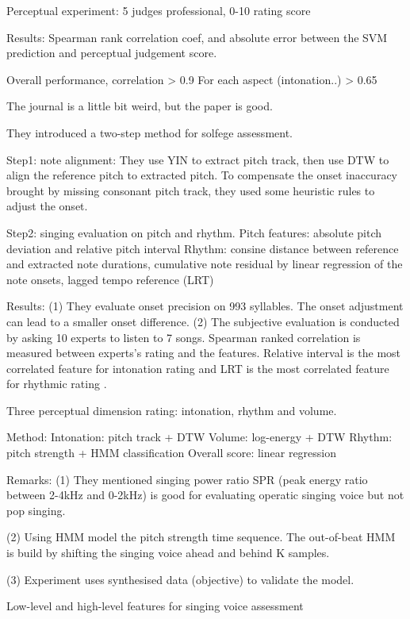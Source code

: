 Perceptual experiment:
5 judges professional, 0-10 rating score

Results:
Spearman rank correlation coef, and absolute error between the SVM prediction and perceptual judgement score.

Overall performance, correlation > 0.9
For each aspect (intonation..) > 0.65

 The journal is a little bit weird, but the paper is good.

They introduced a two-step method for solfege assessment.

Step1: note alignment: They use YIN to extract pitch track, then use DTW to align the reference pitch to extracted pitch. To compensate the onset inaccuracy brought by missing consonant pitch track, they used some heuristic rules to adjust the onset.

Step2: singing evaluation on pitch and rhythm. 
Pitch features: absolute pitch deviation and relative pitch interval
Rhythm: consine distance between reference and extracted note durations, cumulative note residual by linear regression of the note onsets, lagged tempo reference (LRT)

Results:
(1) They evaluate onset precision on 993 syllables. The onset adjustment can lead to a smaller onset difference.
(2) The subjective evaluation is conducted by asking 10 experts to listen to 7 songs. Spearman ranked correlation is measured between experts's rating and the features. Relative interval is the most correlated feature for intonation rating and LRT is the most correlated feature for rhythmic rating
.

 Three perceptual dimension rating: intonation, rhythm and volume.

Method:
Intonation: pitch track + DTW 
Volume: log-energy + DTW
Rhythm: pitch strength + HMM classification
Overall score: linear regression

Remarks:
(1) They mentioned singing power ratio SPR (peak energy ratio between 2-4kHz and 0-2kHz) is good for evaluating operatic singing voice but not pop singing.

(2) Using HMM model the pitch strength time sequence. The out-of-beat HMM is build by shifting the singing voice ahead and behind K samples.

(3) Experiment uses synthesised data (objective) to validate the model.

 Low-level and high-level features for singing voice assessment

